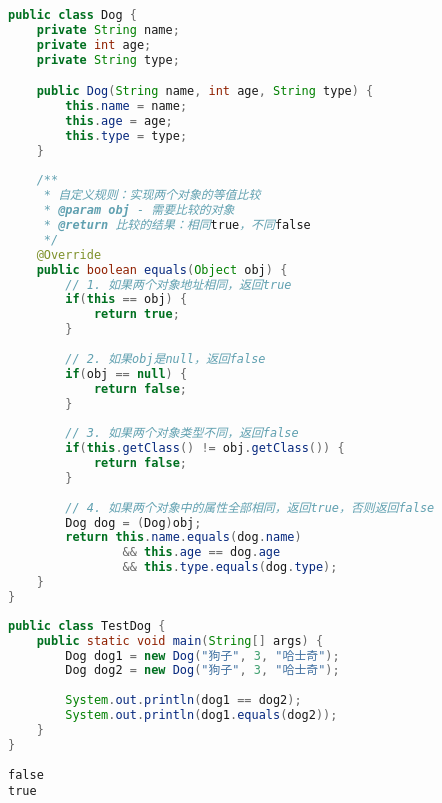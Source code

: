 \begin{lstlisting}[language=Java, title=Dog.java]
public class Dog {
    private String name;
    private int age;
    private String type;

    public Dog(String name, int age, String type) {
        this.name = name;
        this.age = age;
        this.type = type;
    }
    
    /**
     * 自定义规则：实现两个对象的等值比较
     * @param obj - 需要比较的对象
     * @return 比较的结果：相同true，不同false 
     */
    @Override
    public boolean equals(Object obj) {
        // 1. 如果两个对象地址相同，返回true
        if(this == obj) {
            return true;
        }
        
        // 2. 如果obj是null，返回false
        if(obj == null) {
            return false;
        }
        
        // 3. 如果两个对象类型不同，返回false
        if(this.getClass() != obj.getClass()) {
            return false;
        }
        
        // 4. 如果两个对象中的属性全部相同，返回true，否则返回false
        Dog dog = (Dog)obj;
        return this.name.equals(dog.name) 
                && this.age == dog.age 
                && this.type.equals(dog.type);
    }
}
\end{lstlisting}

\begin{lstlisting}[language=Java, title=TestDog.java]
public class TestDog {
    public static void main(String[] args) {
        Dog dog1 = new Dog("狗子", 3, "哈士奇");
        Dog dog2 = new Dog("狗子", 3, "哈士奇");
        
        System.out.println(dog1 == dog2);
        System.out.println(dog1.equals(dog2));
    }
}
\end{lstlisting}

\begin{tcolorbox}
	\begin{verbatim}
false
true
	\end{verbatim}
\end{tcolorbox}

\newpage